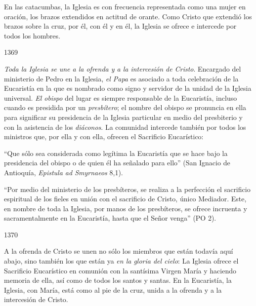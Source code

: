 			\begin{ccebody}En las catacumbas, la Iglesia es con frecuencia representada como una mujer en oración, los brazos extendidos en actitud de orante. Como Cristo que extendió los brazos sobre la cruz, por él, con él y en él, la Iglesia se ofrece e intercede por todos los hombres.\end{ccebody}
			
			\begin{ccebody}\begin{ccenumber}1369\end{ccenumber} \textit{Toda la Iglesia se une a la ofrenda y a la intercesión de Cristo}. Encargado del ministerio de Pedro en la Iglesia, \textit{el Papa} es asociado a toda celebración de la Eucaristía en la que es nombrado como signo y servidor de la unidad de la Iglesia universal. \textit{El obispo} del lugar es siempre responsable de la Eucaristía, incluso cuando es presidida por un \textit{presbítero}; el nombre del obispo se pronuncia en ella para significar su presidencia de la Iglesia particular en medio del presbiterio y con la asistencia de los \textit{diáconos}. La comunidad intercede también por todos los ministros que, por ella y con ella, ofrecen el Sacrificio Eucarístico:\end{ccebody}
			
			\begin{ccecite}“Que sólo sea considerada como legítima la Eucaristía que se hace bajo la presidencia del obispo o de quien él ha señalado para ello” (San Ignacio de Antioquía, \textit{Epistula ad Smyrnaeos} 8,1).\end{ccecite}
			
			\begin{ccecite}“Por medio del ministerio de los presbíteros, se realiza a la perfección el sacrificio espiritual de los fieles en unión con el sacrificio de Cristo, único Mediador. Este, en nombre de toda la Iglesia, por manos de los presbíteros, se ofrece incruenta y sacramentalmente en la Eucaristía, hasta que el Señor venga” (PO 2).\end{ccecite}
			
			\begin{ccebody}\begin{ccenumber}1370\end{ccenumber} A la ofrenda de Cristo se unen no sólo los miembros que están todavía aquí abajo, sino también los que están ya \textit{en la gloria del cielo}: La Iglesia ofrece el Sacrificio Eucarístico en comunión con la santísima Virgen María y haciendo memoria de ella, así como de todos los santos y santas. En la Eucaristía, la Iglesia, con María, está como al pie de la cruz, unida a la ofrenda y a la intercesión de Cristo.\end{ccebody}
			
